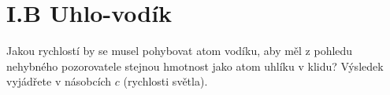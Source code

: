\documentclass{../../../../style/mkimain}
\begin{document}
\section*{I.B Uhlo-vodík}
\noindent Jakou rychlostí by se musel pohybovat atom vodíku, aby měl z pohledu nehybného pozorovatele stejnou hmotnost jako atom uhlíku v klidu? 
Výsledek vyjádřete v násobcích $c$ (rychlosti světla).
\end{document}
